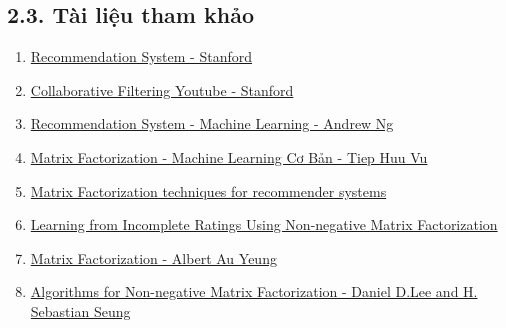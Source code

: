 \documentclass[11pt]{article}
\providecommand{\tightlist}{%
      \setlength{\itemsep}{0pt}\setlength{\parskip}{0pt}}
\begin{document}
    \subsection{2.3. Tài liệu tham
khảo}\label{tuxe0i-liux1ec7u-tham-khux1ea3o}

\begin{enumerate}
\def\labelenumi{\arabic{enumi}.}
\tightlist
\item
  \href{http://infolab.stanford.edu/~ullman/mmds/ch9.pdf}{Recommendation
  System - Stanford}
\item
  \href{https://www.youtube.com/watch?v=h9gpufJFF-0\&t=436s}{Collaborative
  Filtering Youtube - Stanford}
\item
  \href{https://www.youtube.com/watch?v=YW2b8La2ICo}{Recommendation
  System - Machine Learning - Andrew Ng}
\item
  \href{https://machinelearningcoban.com/2017/05/31/matrixfactorization/}{Matrix
  Factorization - Machine Learning Cơ Bản - Tiep Huu Vu}
\item
  \href{https://datajobs.com/data-science-repo/Recommender-Systems-\%5BNetflix\%5D.pdf}{Matrix
  Factorization techniques for recommender systems}
\item
  \href{https://archive.siam.org/meetings/sdm06/proceedings/059zhangs2.pdf}{Learning
  from Incomplete Ratings Using Non-negative Matrix Factorization}
\item
  \href{http://www.albertauyeung.com/post/python-matrix-factorization/}{Matrix
  Factorization - Albert Au Yeung}
\item
  \href{http://hebb.mit.edu/people/seung/papers/nmfconverge.pdf}{Algorithms
  for Non-negative Matrix Factorization - Daniel D.Lee and H. Sebastian
  Seung}
\end{enumerate}


    
    
    
    
\end{document}
